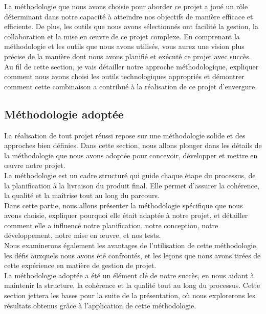 \documentclass[a4paper, 12pt, french]{article}
\begin{document}
			La méthodologie que nous avons choisie pour aborder ce projet a joué un rôle déterminant dans notre capacité à atteindre nos objectifs de manière efficace et efficiente. De plus, les outils que nous avons sélectionnés ont facilité la gestion, la collaboration et la mise en œuvre de ce projet complexe. En comprenant la méthodologie et les outils que nous avons utilisés, vous aurez une vision plus précise de la manière dont nous avons planifié et exécuté ce projet avec succès.\\

			Au fil de cette section, je vais détailler notre approche méthodologique, expliquer comment nous avons choisi les outils technologiques appropriés et démontrer comment cette combinaison a contribué à la réalisation de ce projet d'envergure.

			\subsection{Méthodologie adoptée}
				La réalisation de tout projet réussi repose sur une méthodologie solide et des approches bien définies. Dans cette section, nous allons plonger dans les détails de la méthodologie que nous avons adoptée pour concevoir, développer et mettre en œuvre notre projet.\\

				La méthodologie est un cadre structuré qui guide chaque étape du processus, de la planification à la livraison du produit final. Elle permet d'assurer la cohérence, la qualité et la maîtrise tout au long du parcours.\\

				Dans cette partie, nous allons présenter la méthodologie spécifique que nous avons choisie, expliquer pourquoi elle était adaptée à notre projet, et détailler comment elle a influencé notre planification, notre conception, notre développement, notre mise en œuvre, et nos tests.\\

				Nous examinerons également les avantages de l'utilisation de cette méthodologie, les défis auxquels nous avons été confrontés, et les leçons que nous avons tirées de cette expérience en matière de gestion de projet.\\

				La méthodologie adoptée a été un élément clé de notre succès, en nous aidant à maintenir la structure, la cohérence et la qualité tout au long du processus. Cette section jettera les bases pour la suite de la présentation, où nous explorerons les résultats obtenus grâce à l'application de cette méthodologie.\\
				
\end{document}
